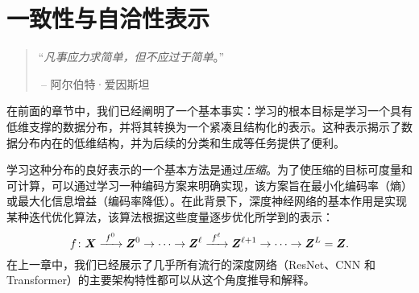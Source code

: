 \documentclass[../../book-main_zh.tex]{subfiles}
\begin{document}
\chapter{一致性与自洽性表示}
\label{ch:consistent}\label{ch:autoencoding}
\label{ch:self-consistent}\label{ch:closed-loop}

\begin{quote}
\hfill  ``{\em 凡事应力求简单，但不应过于简单}。''

$~$\hfill -- 阿尔伯特·爱因斯坦
\end{quote}



\vspace{5mm}


在前面的章节中，我们已经阐明了一个基本事实：学习的根本目标是学习一个具有低维支撑的数据分布，并将其转换为一个紧凑且结构化的表示。这种表示揭示了数据分布内在的低维结构，并为后续的分类和生成等任务提供了便利。

学习这种分布的良好表示的一个基本方法是通过{\em 压缩}。为了使压缩的目标可度量和可计算，可以通过学习一种编码方案来明确实现，该方案旨在最小化编码率（熵）或最大化信息增益（编码率降低）。在此背景下，深度神经网络的基本作用是实现某种迭代优化算法，该算法根据这些度量逐步优化所学到的表示：
\begin{equation}
  f\colon \bm{X}
  \xrightarrow{\hspace{1mm} f^0 \hspace{1mm}} \bm{Z}^0 \rightarrow \cdots
  \rightarrow \bm{Z}^\ell \xrightarrow{\hspace{1mm} f^\ell \hspace{1mm}}
  \bm{Z}^{\ell+1} \rightarrow  \cdots \to \bm{Z}^L = \bm{Z}.
\end{equation}
在上一章中，我们已经展示了几乎所有流行的深度网络（ResNet、CNN 和 Transformer）的主要架构特性都可以从这个角度推导和解释。
\end{document}
